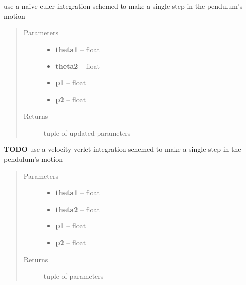 \documentclass[letterpaper,10pt,english]{sphinxmanual}
\begin{document}

\begin{fulllineitems}
\label{index:doublePendulum.euler}
use a naive euler integration schemed to make a single step in
the pendulum's motion
\begin{quote}\begin{description}
\item[{Parameters}] \leavevmode\begin{itemize}
\item {} 
\textbf{theta1} -- float

\item {} 
\textbf{theta2} -- float

\item {} 
\textbf{p1} -- float

\item {} 
\textbf{p2} -- float

\end{itemize}

\item[{Returns}] \leavevmode
tuple of updated parameters

\end{description}\end{quote}

\end{fulllineitems}


\begin{fulllineitems}
\label{index:doublePendulum.velocity_verlet}
\textbf{TODO} use a velocity verlet integration schemed to make a single step in
the pendulum's motion
\begin{quote}\begin{description}
\item[{Parameters}] \leavevmode\begin{itemize}
\item {} 
\textbf{theta1} -- float

\item {} 
\textbf{theta2} -- float

\item {} 
\textbf{p1} -- float

\item {} 
\textbf{p2} -- float

\end{itemize}

\item[{Returns}] \leavevmode
tuple of parameters

\end{description}\end{quote}

\end{fulllineitems}
\end{document}
